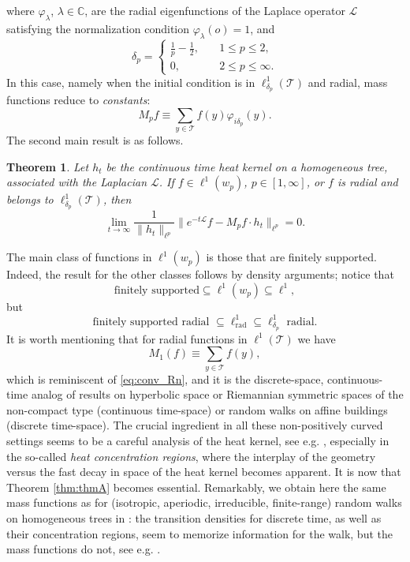 \documentclass[11pt,a4paper,reqno]{amsart}
\renewcommand\mathcal{\mathscr}
\theoremstyle{plain}
\newtheorem{thmx}{Theorem}
\theoremstyle{remark}
\theoremstyle{definition}
\theoremstyle{remark}
\numberwithin{equation}{section}
\begin{document}
	where $\varphi_{\lambda}$, $\lambda\in \mathbb{C}$, are the radial eigenfunctions of the Laplace operator $\mathcal{L}$ satisfying the normalization condition $\varphi_{\lambda}(o)=1$, and 
    \begin{equation}\label{eq:deltap}
    \delta_p=\begin{cases}
		\frac{1}{p}-\frac{1}{2}, &\quad 1\leq p\leq 2, \\
		0, &\quad 2\leq p\leq \infty.
	\end{cases}
    \end{equation}
In this case, namely when the initial condition is in $ \ell^1_{\delta_p}(\mathcal{T})$ and radial, mass functions reduce to \emph{constants}:
	\begin{equation*}
		M_pf \equiv \sum_{y\in \mathcal{T}} f(y) \varphi_{i\delta_p}(y).
	\end{equation*}
The second main result is as follows.

	\begin{thmx}\label{thm:thmB}
		Let $h_t$ be the continuous time heat kernel on a homogeneous tree, associated with the Laplacian $\mathcal{L}$. 
		If $f \in \ell^1(w_p)$, $p \in [1, \infty]$, or $f$ is radial and 
		belongs to $\ell^1_{\delta_p}(\mathcal{T})$, then
		\[ 
		\lim_{t \to \infty} 
		\frac{1}{\|h_t\|_{\ell^p}}
		\| e^{-t\mathcal{L}}f-M_pf\cdot h_t\|_{\ell^p}=0.
		\]
	\end{thmx}
	The main class of functions in $\ell^1(w_p)$ is those that are finitely supported. Indeed, the result for the other classes follows by density arguments; notice that
	\[
	\text{finitely supported}\subseteq \ell^{1}(w_p)\subseteq \ell^{1},
	\]
	but 
	\[
	\text{finitely supported radial }\subseteq \ell^{1}_{\text{rad}}\subseteq \ell^{1}_{\delta_p}\text{ radial}.
	\]
	It is worth mentioning that for radial functions in $\ell^1(\mathcal{T})$
	we have 
	\[
	M_1(f) \equiv \sum_{y \in \mathcal{T}} f(y),
	\]
	which is reminiscent of \eqref{eq:conv_Rn}, and it is the discrete-space, continuous-time analog of results on hyperbolic space or Riemannian symmetric spaces of the non-compact type (continuous time-space) or random walks on affine buildings (discrete time-space). The crucial ingredient in all these non-positively curved settings seems to be a careful analysis of the heat kernel, see e.g. \cite{AJ99, APZ, P1, PT, T}, especially in the so-called \textit{heat concentration regions}, where the interplay of the geometry versus the fast decay in space of the heat kernel becomes apparent. It is now that Theorem \ref{thm:thmA} becomes essential. Remarkably, we obtain here the same mass functions as for (isotropic, aperiodic, irreducible, finite-range) random walks on homogeneous trees in \cite{PT}: the transition densities for discrete time, as well as their concentration regions, seem to memorize information for the walk, but the mass functions do not, see e.g. \cite{PT, T}.
\end{document}
